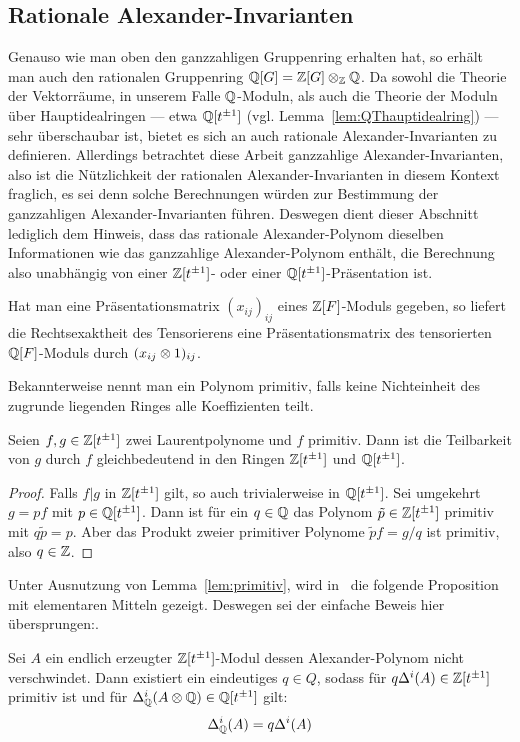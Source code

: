     \subsection{Rationale Alexander-Invarianten}
        	 \label{ssec:rationalalex}

	 Genauso wie man oben den ganzzahligen Gruppenring erhalten hat, so erhält man auch den rationalen Gruppenring $\mathbb{Q}[G]=\mathbb{Z}[G] \otimes_{\mathbb{Z}} \mathbb{Q}$. Da sowohl die Theorie der Vektorräume, in unserem Falle $\mathbb{Q}$-Moduln, als auch die Theorie der Moduln über Hauptidealringen --- etwa $\mathbb{Q}[t^{\pm 1}]$ (vgl. Lemma~\ref{lem:QThauptidealring}) ---  sehr überschaubar ist, bietet es sich an auch rationale Alexander-Invarianten zu definieren. Allerdings betrachtet diese Arbeit ganzzahlige Alexander-Invarianten, also ist die Nützlichkeit der rationalen Alexander-Invarianten in diesem Kontext fraglich, es sei denn solche Berechnungen würden zur Bestimmung der ganzzahligen Alexander-Invarianten führen. Deswegen dient dieser Abschnitt lediglich dem Hinweis, dass das rationale Alexander-Polynom dieselben Informationen wie das ganzzahlige Alexander-Polynom enthält, die Berechnung also unabhängig von einer $\mathbb{Z}[t^{\pm 1}]$- oder einer $\mathbb{Q}[t^{\pm 1}]$-Präsentation ist.

	 \begin{bem}
	 	Hat man eine Präsentationsmatrix $(x_{ij})_{ij}$ eines $\mathbb{Z}[F]$-Moduls gegeben, so liefert die Rechtsexaktheit des Tensorierens eine Präsentationsmatrix des tensorierten $\mathbb{Q}[F]$-Moduls durch $(x_{ij} \otimes 1)_{ij}$.
	 \end{bem}

	 Bekannterweise nennt man ein Polynom primitiv, falls keine Nichteinheit des zugrunde liegenden Ringes alle Koeffizienten teilt. 
	 \begin{lem}
	 \label{lem:primitiv}
	 	Seien $f,g \in \mathbb{Z}[t^{\pm 1}]$ zwei Laurentpolynome und $f$ primitiv. Dann ist die Teilbarkeit von $g$ durch $f$ gleichbedeutend in den Ringen $\mathbb{Z}[t^{\pm 1}]$ und $\mathbb{Q}[t^{\pm 1}]$.
	 \end{lem}
	 \begin{proof}
	 	Falls $f|g$ in $\mathbb{Z}[t^{\pm 1}] $ gilt, so auch trivialerweise in $\mathbb{Q}[t^{\pm 1}]$. Sei umgekehrt $g=pf$ mit $p \in \mathbb{Q}[t^{\pm 1}]$. Dann ist für ein $q \in \mathbb{Q}$ das Polynom $\tilde p \in \mathbb{Z}[t^{\pm 1}]$ primitiv mit $q\tilde p = p$. Aber das Produkt zweier primitiver Polynome $\tilde p f = g/q$ ist primitiv, also $q \in \mathbb{Z}$.
	 \end{proof}

	 Unter Ausnutzung von Lemma~\ref{lem:primitiv}, wird in~\cite[Lemma~2.2]{Shinohara.1972} die folgende Proposition mit elementaren Mitteln gezeigt. Deswegen sei der einfache Beweis hier übersprungen:.	 \begin{prop}
	 	\label{prop:tensoring}
	 	Sei $A$ ein endlich erzeugter $\mathbb{Z}[t^{\pm 1}]$-Modul dessen Alexander-Polynom nicht verschwindet. Dann existiert ein eindeutiges $q\in Q$, sodass für $q\Delta^i(A) \in \mathbb{Z}[t^{\pm 1}]$ primitiv ist und für $\Delta^i_{\mathbb{Q}}(A\otimes \mathbb{Q}) \in \mathbb{Q}[t^{\pm 1}]$ gilt:
	 	\[
	 		 \Delta^i_{\mathbb{Q}}(A) = q\Delta^i(A) 
	 	\]
	 \end{prop}


